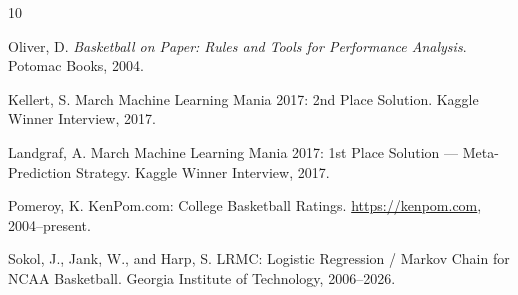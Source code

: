 \documentclass[11pt,a4paper]{article}
\begin{document}

\begin{thebibliography}{10}

Oliver, D.
\newblock \textit{Basketball on Paper: Rules and Tools for Performance Analysis}.
\newblock Potomac Books, 2004.

Kellert, S.
\newblock March Machine Learning Mania 2017: 2nd Place Solution.
\newblock Kaggle Winner Interview, 2017.

Landgraf, A.
\newblock March Machine Learning Mania 2017: 1st Place Solution --- Meta-Prediction Strategy.
\newblock Kaggle Winner Interview, 2017.

Pomeroy, K.
\newblock KenPom.com: College Basketball Ratings.
\newblock \url{https://kenpom.com}, 2004--present.

Sokol, J., Jank, W., and Harp, S.
\newblock LRMC: Logistic Regression / Markov Chain for NCAA Basketball.
\newblock Georgia Institute of Technology, 2006--2026.

\end{thebibliography}
\end{document}
